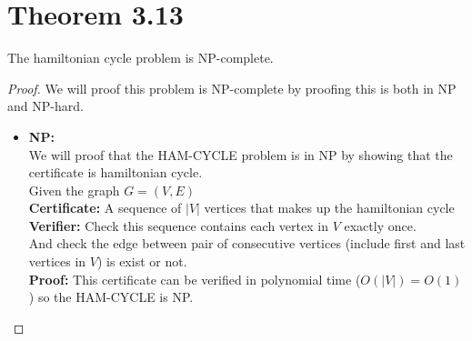 \documentclass{article}
\begin{document}
\section*{Theorem 3.13}
    The hamiltonian cycle problem is NP-complete.

\begin{proof}
    We will proof this problem is NP-complete by proofing this is both in NP and NP-hard.
    \begin{itemize}
        \item \textbf{NP:} \\
        We will proof that the HAM-CYCLE problem is in NP by showing that the certificate is hamiltonian cycle.\\
        Given the graph $G = (V,E)$\\
        \textbf{Certificate:} A sequence of $|V|$ vertices that makes up the hamiltonian cycle\\
        \textbf{Verifier:} Check this sequence contains each vertex in $V$ exactly once.\\
        And check the edge between pair of consecutive vertices (include first and last vertices in $V$) is exist or not.\\
        \textbf{Proof:} This certificate can be verified in polynomial time ($O(|V|) = O(1)$) so the HAM-CYCLE is NP.


\end{itemize}
\end{proof}
\end{document}
